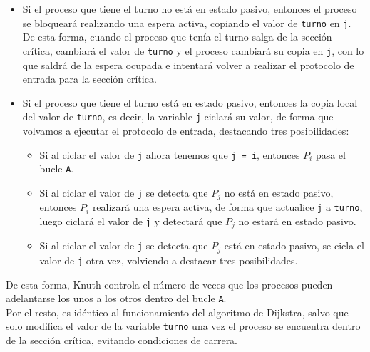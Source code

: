 \begin{itemize}
    \item Si el proceso que tiene el turno no está en estado pasivo, entonces el proceso se bloqueará realizando una espera activa, copiando el valor de \verb|turno| en \verb|j|. De esta forma, cuando el proceso que tenía el turno salga de la sección crítica, cambiará el valor de \verb|turno| y el proceso cambiará su copia en \verb|j|, con lo que saldrá de la espera ocupada e intentará volver a realizar el protocolo de entrada para la sección crítica.
    \item Si el proceso que tiene el turno está en estado pasivo, entonces la copia local del valor de \verb|turno|, es decir, la variable \verb|j| ciclará su valor, de forma que volvamos a ejecutar el protocolo de entrada, destacando tres posibilidades:
        \begin{itemize}
            \item Si al ciclar el valor de \verb|j| ahora tenemos que \verb|j = i|, entonces $P_i$ pasa el bucle \verb|A|.
            \item Si al ciclar el valor de \verb|j| se detecta que $P_j$ no está en estado pasivo, entonces $P_i$ realizará una espera activa, de forma que actualice \verb|j| a \verb|turno|, luego ciclará el valor de \verb|j| y detectará que $P_j$ no estará en estado pasivo.
            \item Si al ciclar el valor de \verb|j| se detecta que $P_j$ está en estado pasivo, se cicla el valor de \verb|j| otra vez, volviendo a destacar tres posibilidades.
        \end{itemize}
\end{itemize}
De esta forma, Knuth controla el número de veces que los procesos pueden adelantarse los unos a los otros dentro del bucle \verb|A|.\\

Por el resto, es idéntico al funcionamiento del algoritmo de Dijkstra, salvo que solo modifica el valor de la variable \verb|turno| una vez el proceso se encuentra dentro de la sección crítica, evitando condiciones de carrera.

